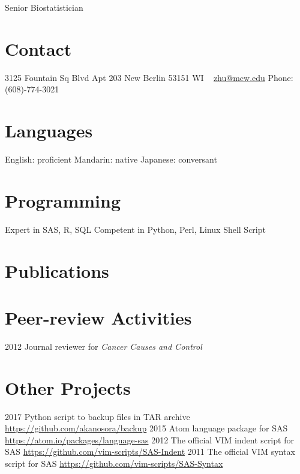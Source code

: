 \documentclass[11pt, print]{friggeri-cv}
\begin{document}
       {Senior Biostatistician}

\begin{aside}
  \section{Contact}
    3125 Fountain Sq Blvd
    Apt 203
    New Berlin
    53151 WI
    ~
    \href{mailto:zhu@mcw.edu}{zhu@mcw.edu}
    Phone: (608)-774-3021
  \section{Languages}
    English: proficient
    Mandarin: native
    Japanese: conversant
  \section{Programming}
    Expert in SAS, R, SQL
    Competent in Python,
    Perl, Linux Shell Script
\end{aside}




\section{Publications}


\section{Peer-review Activities}

\begin{entrylist}
  \simpleentry
    {2012}
    {Journal reviewer for \textit{Cancer Causes and Control}}
    {}
\end{entrylist}

\section{Other Projects}

\begin{entrylist}
  \simpleentry
    {2017}
    {Python script to backup files in TAR archive}
    {\href{https://github.com/akanosora/backup}{https://github.com/akanosora/backup}}
  \simpleentry
    {2015}
    {Atom language package for SAS}
    {\href{https://atom.io/packages/language-sas}{https://atom.io/packages/language-sas}}
  \simpleentry
    {2012}
    {The official VIM indent script for SAS}
    {\href{https://github.com/vim-scripts/SAS-Indent}{https://github.com/vim-scripts/SAS-Indent}}
  \simpleentry
    {2011}
    {The official VIM syntax script for SAS}
    {\href{https://github.com/vim-scripts/SAS-Syntax}{https://github.com/vim-scripts/SAS-Syntax}}
\end{entrylist}
\end{document}
